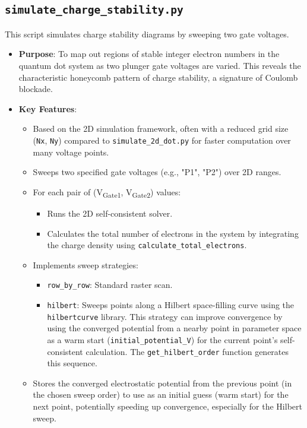 \documentclass{article}
\begin{document}
\subsection{\texttt{simulate\_charge\_stability.py}}
This script simulates charge stability diagrams by sweeping two gate voltages.
\begin{itemize}
    \item \textbf{Purpose}: To map out regions of stable integer electron numbers in the quantum dot system as two plunger gate voltages are varied. This reveals the characteristic honeycomb pattern of charge stability, a signature of Coulomb blockade.
    \item \textbf{Key Features}:
        \begin{itemize}
            \item Based on the 2D simulation framework, often with a reduced grid size (\texttt{Nx}, \texttt{Ny}) compared to \texttt{simulate\_2d\_dot.py} for faster computation over many voltage points.
            \item Sweeps two specified gate voltages (e.g., "P1", "P2") over 2D ranges.
            \item For each pair of (V\textsubscript{Gate1}, V\textsubscript{Gate2}) values:
                \begin{itemize}
                    \item Runs the 2D self-consistent solver.
                    \item Calculates the total number of electrons in the system by integrating the charge density using \texttt{calculate\_total\_electrons}.
                \end{itemize}
            \item Implements sweep strategies:
                \begin{itemize}
                    \item \texttt{row\_by\_row}: Standard raster scan.
                    \item \texttt{hilbert}: Sweeps points along a Hilbert space-filling curve using the \texttt{hilbertcurve} library. This strategy can improve convergence by using the converged potential from a nearby point in parameter space as a warm start (\texttt{initial\_potential\_V}) for the current point's self-consistent calculation. The \texttt{get\_hilbert\_order} function generates this sequence.
                \end{itemize}
            \item Stores the converged electrostatic potential from the previous point (in the chosen sweep order) to use as an initial guess (warm start) for the next point, potentially speeding up convergence, especially for the Hilbert sweep.

\end{itemize}
\end{itemize}
\end{document}
